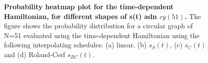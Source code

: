 \begin{figure}[ht]
  \caption[Probability heatmap plot for the time-dependent Hamiltonian, for different shapes of s(t)]{\textbf{Probability heatmap plot for the time-dependent Hamiltonian, for different shapes of s(t) adn $cy(51)$.} The figure shows the probability distribution for a circular graph of N=51 evaluated using the time-dependent Hamiltonian using the following interpolating schedules: (a) linear, (b) $s_S(t)$, (c) $s_C(t)$ and (d) Roland-Cerf $s_{RC}(t)$.}
  \label{fig:heatmap_time_dependent}
\end{figure}
